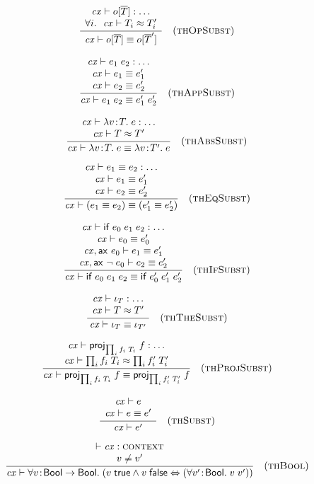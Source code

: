 \[
\frac{\begin{array}{c}\mathit{cx}\vdash o[\overline{T}]:\ldots\\\forall i.\ \ \mathit{cx}\vdash T_i\approx T_i'\end{array}}{\mathit{cx}\vdash o[\overline{T}]\equiv o[\overline{T}']}\quad\mbox{(\textsc{thOpSubst})}
\]

\[
\frac{\begin{array}{c}\mathit{cx}\vdash e_1\;e_2:\ldots\\\mathit{cx}\vdash e_1\equiv e_1'\\\mathit{cx}\vdash e_2\equiv e_2'\end{array}}{\mathit{cx}\vdash e_1\;e_2\equiv e_1'\;e_2'}\quad\mbox{(\textsc{thAppSubst})}
\]

\[
\frac{\begin{array}{c}\mathit{cx}\vdash\lambda v\!:\!T.\;e:\ldots\\\mathit{cx}\vdash T\approx T'\end{array}}{\mathit{cx}\vdash\lambda v\!:\!T.\;e\equiv\lambda v\!:\!T'.\;e}\quad\mbox{(\textsc{thAbsSubst})}
\]

\[
\frac{\begin{array}{c}\mathit{cx}\vdash e_1\equiv e_2:\ldots\\\mathit{cx}\vdash e_1\equiv e_1'\\\mathit{cx}\vdash e_2\equiv e_2'\end{array}}{\mathit{cx}\vdash(e_1\equiv e_2)\equiv(e_1'\equiv e_2')}\quad\mbox{(\textsc{thEqSubst})}
\]

\[
\frac{\begin{array}{c}\mathit{cx}\vdash\mathsf{if}\;e_0\;e_1\;e_2:\ldots\\\mathit{cx}\vdash e_0\equiv e_0'\\\mathit{cx},\mathsf{ax}\ e_0\vdash e_1\equiv e_1'\\\mathit{cx},\mathsf{ax}\ \neg\;e_0\vdash e_2\equiv e_2'\end{array}}{\mathit{cx}\vdash\mathsf{if}\;e_0\;e_1\;e_2\equiv\mathsf{if}\;e_0'\;e_1'\;e_2'}\quad\mbox{(\textsc{thIfSubst})}
\]

\[
\frac{\begin{array}{c}\mathit{cx}\vdash\iota_{T}:\ldots\\\mathit{cx}\vdash T\approx T'\end{array}}{\mathit{cx}\vdash\iota_{T}\equiv\iota_{T'}}\quad\mbox{(\textsc{thTheSubst})}
\]

\[
\frac{\begin{array}{c}\mathit{cx}\vdash\mathsf{proj}_{\prod_{i}f_i\;T_i}\;{f}:\ldots\\\mathit{cx}\vdash\prod_{i}f_i\;T_i\approx\prod_{i}f_i'\;T_i'\end{array}}{\mathit{cx}\vdash\mathsf{proj}_{\prod_{i}f_i\;T_i}\;{f}\equiv\mathsf{proj}_{\prod_{i}f_i'\;T_i'}\;{f}}\quad\mbox{(\textsc{thProjSubst})}
\]




\[
\frac{\begin{array}{c}\mathit{cx}\vdash e\\\mathit{cx}\vdash e\equiv e'\end{array}}{\mathit{cx}\vdash e'}\quad\mbox{(\textsc{thSubst})}
\]


\[
\frac{\begin{array}{c}\vdash\mathit{cx}:\textsc{context}\\v\neq v'\end{array}}{\mathit{cx}\vdash\forall v\!:\!\mathsf{Bool}\to\mathsf{Bool}.\;(v\;\mathsf{true}\wedge v\;\mathsf{false}\Leftrightarrow(\forall v'\!:\!\mathsf{Bool}.\;v\;v'))}\quad\mbox{(\textsc{thBool})}
\]

